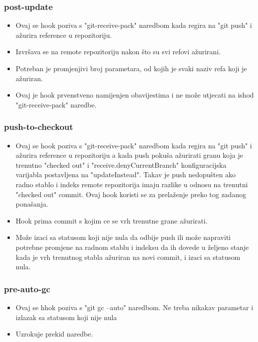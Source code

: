 \documentclass{beamer}
\begin{document}
\begin{frame}
\frametitle{post-update}
\begin{itemize}
    \item Ovaj se hook poziva s "git-receive-pack" naredbom kada regira na "git push" i ažurira reference u repozitoriju.
    \item Izvršava se na remote repozitoriju nakon što su svi refovi ažurirani.
    \item Potreban je promjenjivi broj parametara, od kojih je svaki naziv refa koji je ažuriran.
    \item Ovaj je hook prvenstveno namijenjen obavijestima i ne može utjecati na ishod "git-receive-pack" naredbe.
\end{itemize}
\end{frame}

\begin{frame}
\frametitle{push-to-checkout}
\begin{itemize}
    \item Ovaj se hook poziva s "git-receive-pack" naredbom kada regira na "git push" i ažurira reference u repozitoriju a kada push pokuša ažurirati granu koja je trenutno "checked out" i "receive.denyCurrentBranch" konfiguracijska varijabla postavljena na "updateInstead". Takav je push nedopušten ako radno stablo i indeks remote repozitorija imaju razlike u odnosu na trenutni "checked out" commit. Ovaj hook koristi se za prelaženje preko tog zadanog ponašanja.
    \item Hook prima commit s kojim ce se vrh trenutne grane ažurirati.
    \item Može izaci sa statusom koji nije nula da odbije push ili može napraviti potrebne promjene na radnom stablu i indeksu da ih dovede u željeno stanje kada je vrh trenutnog stabla ažuriran na novi commit, i izaci sa statusom nula.
\end{itemize}
\end{frame}

\begin{frame}
\frametitle{pre-auto-gc}
\begin{itemize}
    \item Ovaj se hhok poziva s "git gc --auto" naredbom. Ne treba nikakav parametar i izlazak sa statusom koji nije nula 
    \item Uzrokuje prekid naredbe.
\end{itemize}
\end{frame}
\end{document}
